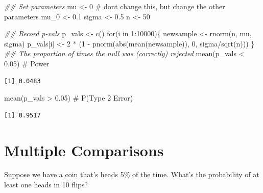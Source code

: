 \documentclass[
  letterpaper,
  DIV=11,
  numbers=noendperiod,
  oneside]{scrreprt}
\newenvironment{Shaded}{\begin{snugshade}}{\end{snugshade}}
\newcommand{\CommentTok}[1]{\textcolor[rgb]{0.37,0.37,0.37}{#1}}
\newcommand{\ControlFlowTok}[1]{\textcolor[rgb]{0.00,0.23,0.31}{#1}}
\newcommand{\DecValTok}[1]{\textcolor[rgb]{0.68,0.00,0.00}{#1}}
\newcommand{\DocumentationTok}[1]{\textcolor[rgb]{0.37,0.37,0.37}{\textit{#1}}}
\newcommand{\FloatTok}[1]{\textcolor[rgb]{0.68,0.00,0.00}{#1}}
\newcommand{\FunctionTok}[1]{\textcolor[rgb]{0.28,0.35,0.67}{#1}}
\newcommand{\NormalTok}[1]{\textcolor[rgb]{0.00,0.23,0.31}{#1}}
\newcommand{\OtherTok}[1]{\textcolor[rgb]{0.00,0.23,0.31}{#1}}
\newcommand{\SpecialCharTok}[1]{\textcolor[rgb]{0.37,0.37,0.37}{#1}}
\begin{document}
\begin{Shaded}
\begin{Highlighting}[]
\DocumentationTok{\#\# Set parameters}
\NormalTok{mu }\OtherTok{\textless{}{-}} \DecValTok{0} \CommentTok{\# don\textquotesingle{}t change this, but change the other parameters}
\NormalTok{mu\_0 }\OtherTok{\textless{}{-}} \FloatTok{0.1}
\NormalTok{sigma }\OtherTok{\textless{}{-}} \FloatTok{0.5}
\NormalTok{n }\OtherTok{\textless{}{-}} \DecValTok{50}

\DocumentationTok{\#\# Record p{-}vals}
\NormalTok{p\_vals }\OtherTok{\textless{}{-}} \FunctionTok{c}\NormalTok{()}
\ControlFlowTok{for}\NormalTok{(i }\ControlFlowTok{in} \DecValTok{1}\SpecialCharTok{:}\DecValTok{10000}\NormalTok{)\{}
\NormalTok{    newsample }\OtherTok{\textless{}{-}} \FunctionTok{rnorm}\NormalTok{(n, mu, sigma)}
\NormalTok{    p\_vals[i] }\OtherTok{\textless{}{-}} \DecValTok{2} \SpecialCharTok{*}\NormalTok{ (}\DecValTok{1} \SpecialCharTok{{-}} \FunctionTok{pnorm}\NormalTok{(}\FunctionTok{abs}\NormalTok{(}\FunctionTok{mean}\NormalTok{(newsample)), }\DecValTok{0}\NormalTok{, sigma}\SpecialCharTok{/}\FunctionTok{sqrt}\NormalTok{(n)))}
\NormalTok{\}}
\DocumentationTok{\#\# The proportion of times the null was (correctly) rejected}
\FunctionTok{mean}\NormalTok{(p\_vals }\SpecialCharTok{\textless{}} \FloatTok{0.05}\NormalTok{) }\CommentTok{\# Power}
\end{Highlighting}
\end{Shaded}

\begin{verbatim}
[1] 0.0483
\end{verbatim}

\begin{Shaded}
\begin{Highlighting}[]
\FunctionTok{mean}\NormalTok{(p\_vals }\SpecialCharTok{\textgreater{}} \FloatTok{0.05}\NormalTok{) }\CommentTok{\# P(Type 2 Error)}
\end{Highlighting}
\end{Shaded}

\begin{verbatim}
[1] 0.9517
\end{verbatim}

\hypertarget{multiple-comparisons}{%
\section{Multiple Comparisons}\label{multiple-comparisons}}

Suppose we have a coin that's heads 5\% of the time. What's the
probability of at least one heads in 10 flips?
\end{document}
